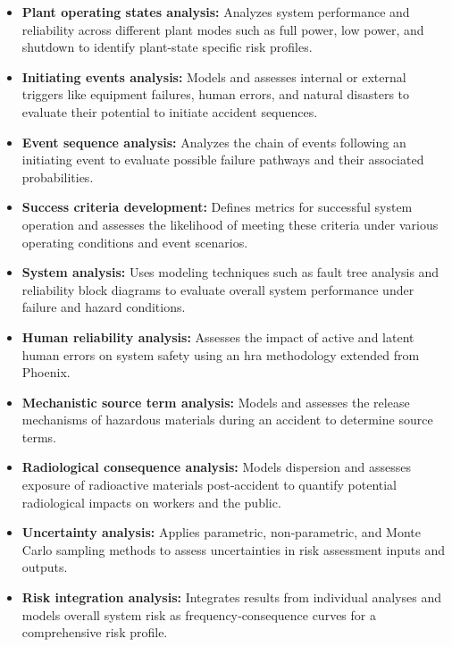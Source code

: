 \begin{itemize}
  \item \textbf{Plant operating states analysis:} Analyzes system performance and reliability across different plant modes such as full power, low power, and shutdown to identify plant-state specific risk profiles.
  \item \textbf{Initiating events analysis:} Models and assesses internal or external triggers like equipment failures, human errors, and natural disasters to evaluate their potential to initiate accident sequences.
  \item \textbf{Event sequence analysis:} Analyzes the chain of events following an initiating event to evaluate possible failure pathways and their associated probabilities.
  \item \textbf{Success criteria development:} Defines metrics for successful system operation and assesses the likelihood of meeting these criteria under various operating conditions and event scenarios.
  \item \textbf{System analysis:} Uses modeling techniques such as fault tree analysis and reliability block diagrams to evaluate overall system performance under failure and hazard conditions.
  \item \textbf{Human reliability analysis:} Assesses the impact of active and latent human errors on system safety using an \acrshort{hra} methodology extended from Phoenix.
  \item \textbf{Mechanistic source term analysis:} Models and assesses the release mechanisms of hazardous materials during an accident to determine source terms.
  \item \textbf{Radiological consequence analysis:} Models dispersion and assesses exposure of radioactive materials post‑accident to quantify potential radiological impacts on workers and the public.
  \item \textbf{Uncertainty analysis:} Applies parametric, non‑parametric, and Monte Carlo sampling methods to assess uncertainties in risk assessment inputs and outputs.
  \item \textbf{Risk integration analysis:} Integrates results from individual analyses and models overall system risk as frequency‑consequence curves for a comprehensive risk profile.
\end{itemize}





